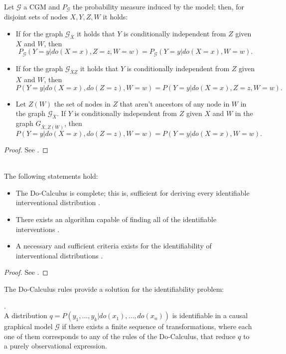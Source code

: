 \documentclass{svjour3}                     %
\begin{document}
\begin{theorem}{\label{docalculus}}
Let $\mathcal{G}$ a CGM and $P_{\mathcal{G}}$ the probability measure induced by the model; then, for disjoint sets of nodes $X,Y,Z,W$ it holds:
\begin{itemize}
\item If for the graph $\mathcal{G}_{\bar{X}}$ it holds that $Y$ is conditionally independent from  $Z$ given $X$ and $W$, then
\[ P_{\mathcal{G}}(Y=y | do(X=x), Z=z, W=w) = P_{\mathcal{G}}(Y=y | do(X=x), W=w). \]
\item If for the graph $\mathcal{G}_{\bar{X}\underline{Z}}$ it holds that $Y$ is conditionally independent from $Z$ given $X$ and $W$, then
\[ P(Y=y | do(X=x), do(Z=z), W=w) = P(Y=y | do(X=x), Z = z, W=w). \]
\item Let $Z(W)$ the set of nodes in  $Z$ that aren't ancestors of any node in  $W$ in the graph $\mathcal{G}_{\bar{X}}$.  If $Y$ is conditionally independent from $Z$ given $X$ and $W$ in the graph $G_{\bar{X}, \bar{Z(W)}}$, then
\[ P(Y=y | do(X=x), do(Z=z), W=w) = P(Y=y | do(X=x), W=w). \]
\end{itemize}
\end{theorem}
\begin{proof}
See \cite{pearl2009causality}.
\end{proof}
\begin{theorem}{\cite{peters2017elements}}\\
The following statements hold:
\begin{itemize}
\item The Do-Calculus is complete; this is, sufficient for deriving every identifiable interventional distribution \citep{huang2006pearl,shpitser2006identification}.
\item There exists an algorithm capable of finding all of the identifiable interventions \citep{tian2002,huang2006pearl}.
\item A necessary and sufficient criteria exists for the identifiability of interventional distributions \citep{shpitser2006identification,huang2006pearl}.
\end{itemize}
\end{theorem}
\begin{proof}
See \cite{peters2017elements}.
\end{proof}
The Do-Calculus rules provide a solution for the identifiability problem:
\begin{corollary} \cite{pearl2009causality}.\\
A distribution $q=P(y_1,...,y_k | do(x_1),...,do(x_n))$ is identifiable in a causal graphical model $\mathcal{G}$ if there exists a finite sequence of transformations, where each one of them corresponds to any of the rules of the Do-Calculus, that reduce $q$ to a purely observational expression.
\end{corollary}
\end{document}
